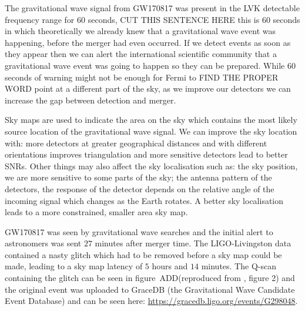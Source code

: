 The gravitational wave signal from GW170817 was present in the LVK detectable frequency range for $60$ seconds, CUT THIS SENTENCE HERE this is $60$ seconds in which theoretically we already knew that a gravitational wave event was happening, before the merger had even occurred. If we detect events as soon as they appear then we can alert the international scientific community that a gravitational wave event was going to happen so they can be prepared. While $60$ seconds of warning might not be enough for Fermi to FIND THE PROPER WORD point at a different part of the sky, as we improve our detectors we can increase the gap between detection and merger.

Sky maps are used to indicate the area on the sky which contains the most likely source location of the gravitational wave signal. We can improve the sky location with: more detectors at greater geographical distances and with different orientations improves triangulation and more sensitive detectors lead to better SNRs. Other things may also affect the sky localisation such as: the sky position, we are more sensitive to some parts of the sky; the antenna pattern of the detectors, the response of the detector depends on the relative angle of the incoming signal which changes as the Earth rotates. A better sky localisation leads to a more constrained, smaller area sky map.

GW170817 was seen by gravitational wave searches and the initial alert to astronomers was sent $27$ minutes after merger time. The LIGO-Livingston data contained a nasty glitch which had to be removed before a sky map could be made, leading to a sky map latency of $5$ hours and $14$ minutes. The Q-scan containing the glitch can be seen in figure~ADD(reproduced from \cite{GW170817:2017}, figure 2) and the original event was uploaded to GraceDB (the Gravitational Wave Candidate Event Database) and can be seen here: \href{https://gracedb.ligo.org/events/G298048}{https://gracedb.ligo.org/events/G298048}.

